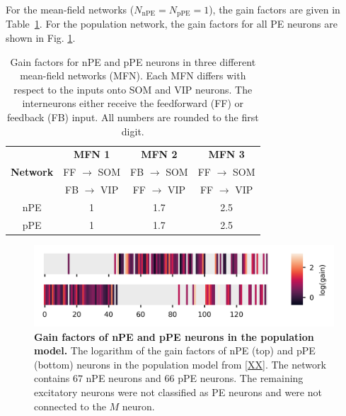 \documentclass[10pt,a4paper,draft]{article}
\begin{document}
For the mean-field networks ($ N_\mathrm{nPE} = N_\mathrm{pPE} = 1 $), the gain factors are given in Table~\ref{tab:gain_factors_MFN}. For the population network, the gain factors for all PE neurons are shown in Fig. \ref{fig:Fig_gains}. 
%
\begin{table}[h!]
\centering
\begin{tabular}{ |c|c|c|c| }
\hline
 & \textbf{MFN 1} & \textbf{MFN 2} & \textbf{MFN 3}  \\
\textbf{Network} & FF $\rightarrow$ SOM  & FB $\rightarrow$ SOM  & FF $\rightarrow$ SOM  \\
 & FB $\rightarrow$ VIP  & FF $\rightarrow$ VIP  & FF $\rightarrow$ VIP  \\
\hline
\hline
nPE & 1 & 1.7 & 2.5\\
pPE & 1 & 1.7 & 2.5 \\
\hline
\end{tabular}
\caption{\footnotesize{Gain factors for nPE and pPE neurons in three different mean-field networks (MFN). Each MFN differs with respect to the inputs onto SOM and VIP neurons. The interneurons either receive the feedforward (FF) or feedback (FB) input. All numbers are rounded to the first digit.}}
\label{tab:gain_factors_MFN}
\end{table}
%
%
\begin{figure}[h!]
	\centering
    \includegraphics{../results/figures/final/Figure_gains}
\caption{\footnotesize{\bf Gain factors of nPE and pPE neurons in the population model.\newline}
{The logarithm of the gain factors of nPE (top) and pPE (bottom) neurons in the population model from \ref{XX}. The network contains $67$ nPE neurons and $66$ pPE neurons. The remaining excitatory neurons were not classified as PE neurons and were not connected to the $M$ neuron. }}
\label{fig:Fig_gains}
\end{figure}
%
%
\end{document}
